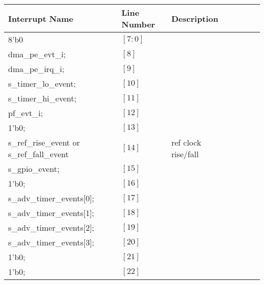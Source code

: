 {\small
\begin{tabularx}{\textwidth}{|l|l|l|l|l|l|X|}
  \hline
  \textbf{Interrupt Name} & \textbf{Line Number}  & \textbf{Description} \\
  \hline
  8'b0                                 & $[7:0]$       &                                           \\
  \hline
  dma\_pe\_evt\_i;                     & $[8]$         &                                           \\
  \hline
  dma\_pe\_irq\_i;                     & $[9]$         &                                           \\
  \hline
  s\_timer\_lo\_event;                 & $[10]$        &                                           \\
  \hline
  s\_timer\_hi\_event;                 & $[11]$        &                                           \\
  \hline
  pf\_evt\_i;                          & $[12]$        &                                           \\
  \hline
  1'b0;                                & $[13]$        &                                           \\
  \hline
  s\_ref\_rise\_event or s\_ref\_fall\_event & $[14]$        & ref clock rise/fall                       \\
  \hline
  s\_gpio\_event;                      & $[15]$        &                                           \\
  \hline
  1'b0;                                & $[16]$        &                                           \\
  \hline
  s\_adv\_timer\_events[0];            & $[17]$        &                                           \\
  \hline
  s\_adv\_timer\_events[1];            & $[18]$        &                                           \\
  \hline
  s\_adv\_timer\_events[2];            & $[19]$        &                                           \\
  \hline
  s\_adv\_timer\_events[3];            & $[20]$        &                                           \\
  \hline
  1'b0;                                & $[21]$        &                                           \\
  \hline
  1'b0;                                & $[22]$        &                                           \\

\end{tabularx}}
